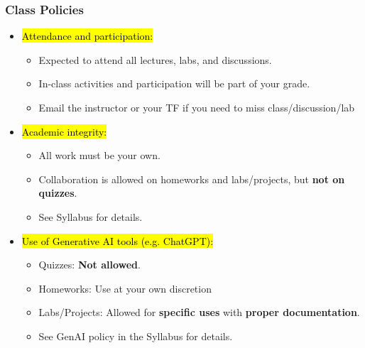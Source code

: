 \documentclass[slidestop,compress,mathserif]{beamer}
\begin{document}

\begin{frame}
	\frametitle{Class Policies} 
	\begin{itemize}
		\item \hl{Attendance and participation:} 
		\begin{itemize}
			\item Expected to attend all lectures, labs, and discussions. 
			\item In-class activities and participation will be part of your grade.
			\item Email the instructor or your TF if you need to miss class/discussion/lab
		\end{itemize}
		\item \hl{Academic integrity:} 
		\begin{itemize}
			\item All work must be your own. 
			\item Collaboration is allowed on homeworks and labs/projects, but \textbf{not on quizzes}. 
			\item See Syllabus for details.
		\end{itemize}
		\item \hl{Use of Generative AI tools (e.g. ChatGPT):}
		\begin{itemize}
			\item Quizzes: \textbf{Not allowed}.
			\item Homeworks: Use at your own discretion
			\item Labs/Projects: Allowed for \textbf{specific uses} with \textbf{proper documentation}.
			\item See GenAI policy in the Syllabus for details.
		\end{itemize}
	\end{itemize}
\end{frame}
\end{document}

